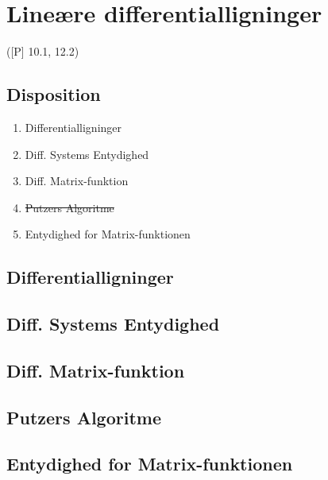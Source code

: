 \newpage
\chapter{Lineære differentialligninger}
([P] 10.1, 12.2)

\section*{Disposition}
\begin{enumerate}
	\item Differentialligninger
	\item Diff. Systems Entydighed
	\item Diff. Matrix-funktion
	\item \sout{Putzers Algoritme}
	\item Entydighed for Matrix-funktionen 
\end{enumerate}

\section{Differentialligninger}


\section{Diff. Systems Entydighed}


\section{Diff. Matrix-funktion}


\section*{Putzers Algoritme}


\section{Entydighed for Matrix-funktionen}


